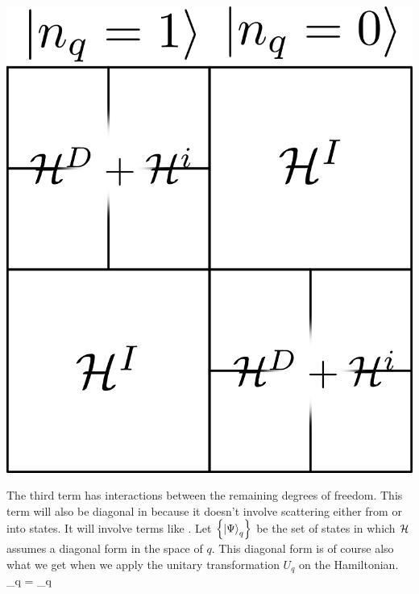 \documentclass[12pt,twoside]{article}
\numberwithin{equation}{section}
\begin{document}
{\begin{minipage}{165pt}
\begin{center}
\includegraphics[scale=0.6]{ham.png}
\end{center}
\end{minipage}
\pb The third term  has interactions between the remaining degrees of freedom.
This term will also be diagonal in  because it doesn't involve scattering either from or into  states.
It will involve terms like .
\pb Let \(\left\{{\ket{\Psi}_q}\right\}\) be the set of states in which \(\mathcal{H}\) assumes a diagonal form in the space of \(q\). This diagonal form is of course also what we get when we apply the unitary transformation \(U_q\) on the Hamiltonian.
\beq[tanjiro]
\ham \ket{\Psi}_q = \tilde \ham \ket{\Psi}_q
\eeq
{}}
\end{document}
